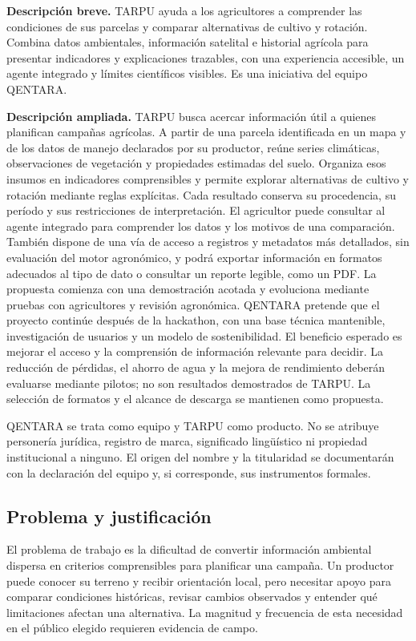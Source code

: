 \documentclass[10pt,a4paper]{article}
\begin{document}
\textbf{Descripción breve.} TARPU ayuda a los agricultores a comprender las condiciones de sus parcelas y comparar alternativas de cultivo y rotación. Combina datos ambientales, información satelital e historial agrícola para presentar indicadores y explicaciones trazables, con una experiencia accesible, un agente integrado y límites científicos visibles. Es una iniciativa del equipo QENTARA.


\textbf{Descripción ampliada.} TARPU busca acercar información útil a quienes planifican campañas agrícolas. A partir de una parcela identificada en un mapa y de los datos de manejo declarados por su productor, reúne series climáticas, observaciones de vegetación y propiedades estimadas del suelo. Organiza esos insumos en indicadores comprensibles y permite explorar alternativas de cultivo y rotación mediante reglas explícitas. Cada resultado conserva su procedencia, su período y sus restricciones de interpretación. El agricultor puede consultar al agente integrado para comprender los datos y los motivos de una comparación. También dispone de una vía de acceso a registros y metadatos más detallados, sin evaluación del motor agronómico, y podrá exportar información en formatos adecuados al tipo de dato o consultar un reporte legible, como un PDF. La propuesta comienza con una demostración acotada y evoluciona mediante pruebas con agricultores y revisión agronómica. QENTARA pretende que el proyecto continúe después de la hackathon, con una base técnica mantenible, investigación de usuarios y un modelo de sostenibilidad. El beneficio esperado es mejorar el acceso y la comprensión de información relevante para decidir. La reducción de pérdidas, el ahorro de agua y la mejora de rendimiento deberán evaluarse mediante pilotos; no son resultados demostrados de TARPU. La selección de formatos y el alcance de descarga se mantienen como propuesta.


QENTARA se trata como equipo y TARPU como producto. No se atribuye personería jurídica, registro de marca, significado lingüístico ni propiedad institucional a ninguno. El origen del nombre y la titularidad se documentarán con la declaración del equipo y, si corresponde, sus instrumentos formales.


\subsection{Problema y justificación}

El problema de trabajo es la dificultad de convertir información ambiental dispersa en criterios comprensibles para planificar una campaña. Un productor puede conocer su terreno y recibir orientación local, pero necesitar apoyo para comparar condiciones históricas, revisar cambios observados y entender qué limitaciones afectan una alternativa. La magnitud y frecuencia de esta necesidad en el público elegido requieren evidencia de campo.
\end{document}

